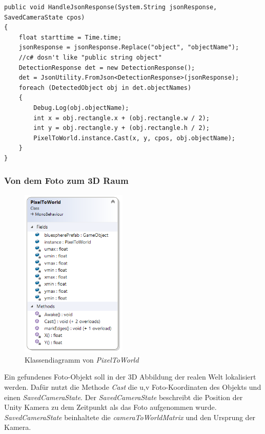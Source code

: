 \begin{lstlisting}
public void HandleJsonResponse(System.String jsonResponse, SavedCameraState cpos)
{
	float starttime = Time.time;
	jsonResponse = jsonResponse.Replace("object", "objectName"); 
	//c# dosn't like "public string object"
	DetectionResponse det = new DetectionResponse();
	det = JsonUtility.FromJson<DetectionResponse>(jsonResponse);
	foreach (DetectedObject obj in det.objectNames)
	{
		Debug.Log(obj.objectName);
		int x = obj.rectangle.x + (obj.rectangle.w / 2);
		int y = obj.rectangle.y + (obj.rectangle.h / 2);
		PixelToWorld.instance.Cast(x, y, cpos, obj.objectName);
	}
}
\end{lstlisting}


\subsubsection{Von dem Foto zum 3D Raum}

\begin{figure}[H]
	\centering
	\includegraphics[width=0.45\textwidth]{images/dia_pixeltoworld.PNG}
	\caption[Klassendiagramm von \textit{PixelToWorld}]{Klassendiagramm von \textit{PixelToWorld}}
	\label{dia:pixeltoworld}
\end{figure}

Ein gefundenes Foto-Objekt soll in der 3D Abbildung der realen Welt lokalisiert werden. Dafür nutzt die Methode \textit{Cast} die u,v Foto-Koordinaten des Objekts und einen \textit{SavedCameraState}. Der \textit{SavedCameraState} beschreibt die Position der Unity Kamera zu dem Zeitpunkt als das Foto aufgenommen wurde. \textit{SavedCameraState} beinhaltete die \textit{cameraToWorldMatrix} und den Ursprung der Kamera.


